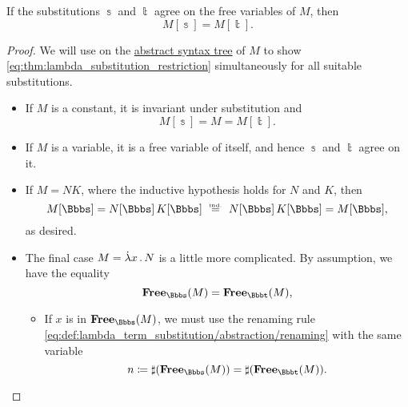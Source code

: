 \begin{proposition}\label{thm:lambda_substitution_restriction}
  If the substitutions \( \Bbbs \) and \( \Bbbt \) agree on the free variables of \( M \), then
  \begin{equation}\label{eq:thm:lambda_substitution_restriction}
    M[\Bbbs] = M[\Bbbt].
  \end{equation}
\end{proposition}
\begin{proof}
  We will use  on the \hyperref[def:lambda_term_ast]{abstract syntax tree} of \( M \) to show \eqref{eq:thm:lambda_substitution_restriction} simultaneously for all suitable substitutions.

  \begin{itemize}
    \item If \( M \) is a constant, it is invariant under substitution and
    \begin{equation*}
      M[\Bbbs] = M = M[\Bbbt].
    \end{equation*}

    \item If \( M \) is a variable, it is a free variable of itself, and hence \( \Bbbs \) and \( \Bbbt \) agree on it.

    \item If \( M = NK \), where the inductive hypothesis holds for \( N \) and \( K \), then
    \begin{equation*}
      M[\Bbbs]
      =
      N[\Bbbs] \thinspace K[\Bbbs]
      \reloset {\T{ind.}} =
      N[\Bbbs] \thinspace K[\Bbbs]
      =
      M[\Bbbs],
    \end{equation*}
    as desired.

    \item The final case \( M = \qabs x N \) is a little more complicated. By assumption, we have the equality
    \begin{equation*}
      \op*{Free}_\Bbbs(M) = \op*{Free}_\Bbbt(M),
    \end{equation*}

    \begin{itemize}
      \item If \( x \) is in \( \op*{Free}_\Bbbs(M) \), we must use the renaming rule \eqref{eq:def:lambda_term_substitution/abstraction/renaming} with the same variable
      \begin{equation*}
        n \coloneqq \sharp(\op*{Free}_\Bbbs(M)) = \sharp(\op*{Free}_\Bbbt(M)).
      \end{equation*}


\end{itemize}
\end{itemize}
\end{proof}
